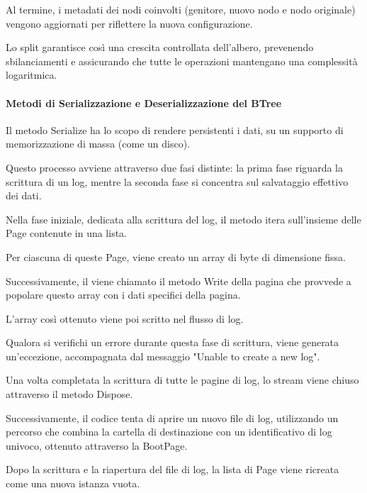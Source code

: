 \documentclass[12pt,a4paper,openright,twoside]{book}
\begin{document}
                    Al termine, i metadati dei nodi coinvolti (genitore, nuovo nodo e nodo originale) vengono aggiornati per riflettere la nuova configurazione.

                    Lo split garantisce così una crescita controllata dell'albero, prevenendo sbilanciamenti e assicurando che tutte le operazioni mantengano una complessità logaritmica.

                \paragraph{Metodi di Serializzazione e Deserializzazione del BTree}

                    

                    Il metodo Serialize ha lo scopo di rendere persistenti i dati, su un supporto di memorizzazione di massa (come un disco).

                    Questo processo avviene attraverso due fasi distinte: la prima fase riguarda la scrittura di un log, mentre la seconda fase si concentra sul salvataggio effettivo dei dati.

                    Nella fase iniziale, dedicata alla scrittura del log, il metodo itera sull'insieme delle Page contenute in una lista.

                    Per ciascuna di queste Page, viene creato un array di byte di dimensione fissa.

                    Successivamente, il viene chiamato il metodo Write della pagina che provvede a popolare questo array con i dati specifici della pagina.

                    L'array così ottenuto viene poi scritto nel flusso di log.

                    Qualora si verifichi un errore durante questa fase di scrittura, viene generata un'eccezione, accompagnata dal messaggio "Unable to create a new log".

                    Una volta completata la scrittura di tutte le pagine di log, lo stream viene chiuso attraverso il metodo Dispose.

                    Successivamente, il codice tenta di aprire un nuovo file di log, utilizzando un percorso che combina la cartella di destinazione con un identificativo di log univoco, ottenuto attraverso la BootPage.

                    Dopo la scrittura e la riapertura del file di log, la lista di Page viene ricreata come una nuova istanza vuota.
\end{document}
